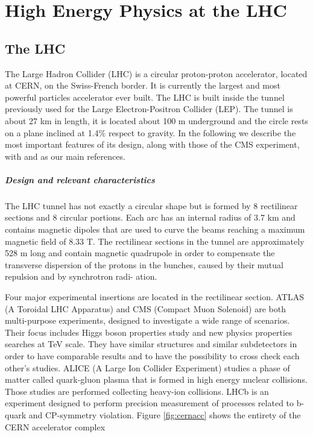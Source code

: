 \chapter{High Energy Physics at the LHC}\label{ch:plhc} %

\section{The LHC}

The Large Hadron Collider (LHC) is a circular proton-proton accelerator, located at
CERN, on the Swiss-French border. It is currently the largest and most powerful
particles accelerator ever built. The LHC is built inside the tunnel previously used
for the Large Electron-Positron Collider (LEP). The tunnel is about 27 km in length,
it is located about 100 m underground and the circle rests on a plane inclined
at 1.4$\%$ respect to gravity. In the following we describe the most important features of its design, along with those of the CMS experiment, with \cite{Giannini:2730094} and \cite{Mandorli:2775677} as our main references.

\paragraph{Design and relevant characteristics}

The LHC tunnel has not exactly a circular shape but is formed by 8 rectilinear sections and 8 circular portions. Each arc has an internal radius of 3.7 km and contains
magnetic dipoles that are used to curve the beams reaching a maximum magnetic
field of 8.33 T. The rectilinear sections in the tunnel are approximately 528 m long and contain magnetic quadrupole in order to compensate the transverse dispersion of the
protons in the bunches, caused by their mutual repulsion and by synchrotron radi-
ation.


Four major experimental insertions are located in the rectilinear section. ATLAS (A Toroidal
LHC Apparatus) and CMS (Compact Muon Solenoid) are both multi-purpose experiments, designed to
investigate a wide range of scenarios. Their focus includes Higgs boson properties
study and new physics properties searches at TeV scale. They have similar structures and similar subdetectors in order to have comparable results and to have the
possibility to cross check each other’s studies. ALICE (A Large Ion Collider Experiment) studies a phase of matter called quark-gluon plasma that is formed in
high energy nuclear collisions. Those studies are performed collecting heavy-ion
collisions. LHCb is an experiment designed to perform precision measurement of processes related to b-quark and CP-symmetry violation. Figure \ref{fig:cernacc} shows the entirety of the CERN accelerator complex

